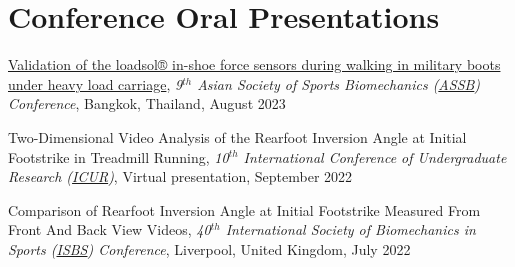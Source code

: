 \documentclass[../main.tex]{subfiles}
\begin{document}



\section{Conference Oral Presentations}
  \vspace{2pt}
    \resumeSubHeadingListStart
    \item
        \def\labelprefix{CP}
        \begin{etaremune}
            \item\label{conference_pre: assb2023} {{\href{https://drive.google.com/file/d/14fXD-NCv7RaUOVawk8WXfbYr1mvYPa2A/view?usp=sharing}{Validation of the loadsol® in-shoe force sensors during walking in military boots under heavy load carriage}}, \textit{9$^{th}$ Asian Society of Sports Biomechanics (\href{http://www.assbweb.org/}{ASSB}) Conference}, Bangkok, Thailand, August 2023}
            
            \item\label{conference_pre: icur2022} {Two-Dimensional Video Analysis of the Rearfoot Inversion Angle at Initial Footstrike in Treadmill Running, \textit{10$^{th}$ International Conference of Undergraduate Research (\href{https://www.icurportal.com/}{ICUR})}, Virtual presentation, September 2022}
            
            \item\label{conference_pre: isbs2022} {Comparison of Rearfoot Inversion Angle at Initial Footstrike Measured From Front And Back View Videos, \textit{40$^{th}$ International Society of Biomechanics in Sports (\href{https://isbs.org/}{ISBS}) Conference}, Liverpool, United Kingdom, July 2022}
        \end{etaremune}
    \resumeSubHeadingListEnd
\end{document}
